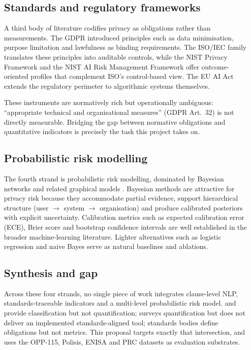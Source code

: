 \documentclass[12pt,a4paper,titlepage]{article}
\begin{document}
\subsection{Standards and regulatory frameworks}

A third body of literature codifies privacy as obligations rather than measurements. The GDPR \parencite{gdpr2016} introduced principles such as data minimisation, purpose limitation and lawfulness as binding requirements. The ISO/IEC family \parencite{iso27001_2022, iso27701_2019, iso29100_2011, iso29151_2017} translates these principles into auditable controls, while the NIST Privacy Framework \parencite{nist_pf_2020} and the NIST AI Risk Management Framework \parencite{nist_aiRMF_2023} offer outcome-oriented profiles that complement ISO's control-based view. The EU AI Act \parencite{eu_ai_act_2024} extends the regulatory perimeter to algorithmic systems themselves.

These instruments are normatively rich but operationally ambiguous: ``appropriate technical and organisational measures'' (GDPR Art.~32) is not directly measurable. Bridging the gap between normative obligations and quantitative indicators is precisely the task this project takes on.

\subsection{Probabilistic risk modelling}

The fourth strand is probabilistic risk modelling, dominated by Bayesian networks and related graphical models \parencite{pearl1988probabilistic, koller2009pgm}. Bayesian methods are attractive for privacy risk because they accommodate partial evidence, support hierarchical structure (user $\rightarrow$ system $\rightarrow$ organisation) and produce calibrated posteriors with explicit uncertainty. Calibration metrics such as expected calibration error (ECE), Brier score and bootstrap confidence intervals are well established in the broader machine-learning literature. Lighter alternatives such as logistic regression and naive Bayes serve as natural baselines and ablations.

\subsection{Synthesis and gap}

Across these four strands, no single piece of work integrates clause-level NLP, standards-traceable indicators and a multi-level probabilistic risk model. \textcite{harkous2018polisis} and \textcite{muralitharan2024privacybertlstm} provide classification but not quantification; \textcite{arshad2024characterisation} surveys quantification but does not deliver an implemented standards-aligned tool; standards bodies define obligations but not metrics. This proposal targets exactly that intersection, and uses the OPP-115, Polisis, ENISA and PRC datasets as evaluation substrates.
\end{document}
